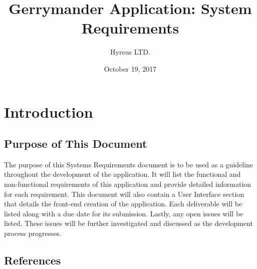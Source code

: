 \documentclass{article}
\begin{document}
\begin{titlepage}
	\title{Gerrymander Application: System Requirements}
	\author{Hyreus LTD.}
	\date{October 19, 2017}
	\maketitle
	\thispagestyle{empty}
\end{titlepage}



\tableofcontents
\thispagestyle{empty}
\cleardoublepage

\setcounter{page}{1}



\section{Introduction}\label{sec:intro}


\subsection{Purpose of This Document}

\vspace{2.5mm}

\begin{addmargin}[4em]{0em}

The purpose of this Systems Requirements document is to be used as a guideline throughout the development of the application. It will list the functional and non-functional requirements of this application and provide detailed information for each requirement. This document will also contain a User Interface section that details the front-end creation of the application. Each deliverable will be listed along with a due date for its submission. Lastly, any open issues will be listed. These issues will be further investigated and discussed as the development process progresses.

\end{addmargin}

\vspace{2.5mm}


\subsection{References}

\vspace{2.5mm}
\end{document}
